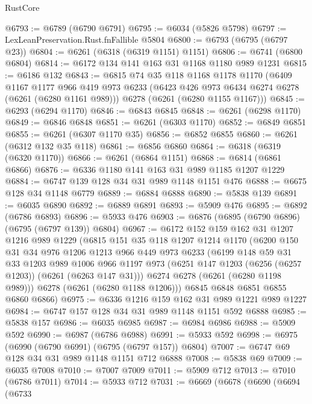 \begin{lexlean}{RustCore}
\begin{coremodule}
@6793 := @6789 (@6790 @6791)
@6795 := @6034 (@5826 @5798)
@6797 := LexLeanPreservation.Rust.fnFallible @5804
@6800 := @6793 (@6795 (@6797 @23))
@6804 := @6261 (@6318 (@6319 @1151) @1151)
@6806 := @6741 (@6800 @6804)
@6814 := @6172 @134 @141 @163 @31 @1168 @1180 @989 @1231
@6815 := @6186 @132
@6843 := @6815
    @74
    @35
    @118
    @1168
    @1178
    @1170
    (@6409
      @1167
      @1177
      @966
      @419
      @973
      @6233
      (@6423 @426 @973 @6434 @6274 @6278 (@6261 (@6280 @1161 @989)))
      @6278
      (@6261 (@6280 @1155 @1167)))
@6845 := @6293 (@6294 @1170)
@6846 := @6843 @6845
@6848 := @6261 (@6298 @1170)
@6849 := @6846 @6848
@6851 := @6261 (@6303 @1170)
@6852 := @6849 @6851
@6855 := @6261 (@6307 @1170 @35)
@6856 := @6852 @6855
@6860 := @6261 (@6312 @132 @35 @118)
@6861 := @6856 @6860
@6864 := @6318 (@6319 (@6320 @1170))
@6866 := @6261 (@6864 @1151)
@6868 := @6814 (@6861 @6866)
@6876 := @6336 @1180 @141 @163 @31 @989 @1185 @1207 @1229
@6884 := @6747 @139 @128 @34 @31 @989 @1148 @1151 @476
@6888 := @6675 @128 @34 @1148 @6779
@6889 := @6884 @6888
@6890 := @5838 @139
@6891 := @6035 @6890
@6892 := @6889 @6891
@6893 := @5909 @476
@6895 := @6892 (@6786 @6893)
@6896 := @5933 @476
@6903 := @6876 (@6895 (@6790 @6896) (@6795 (@6797 @139)) @6804)
@6967 := @6172
    @152
    @159
    @162
    @31
    @1207
    @1216
    @989
    @1229
    (@6815
      @151
      @35
      @118
      @1207
      @1214
      @1170
      (@6200
        @150
        @31
        @34
        @976
        @1206
        @1213
        @966
        @449
        @973
        @6233
        (@6199
          @148
          @59
          @31
          @33
          @1203
          @989
          @1006
          @966
          @1197
          @973
          (@6251 @147 @1203 (@6256 (@6257 @1203)) (@6261 (@6263 @147 @31)))
          @6274
          @6278
          (@6261 (@6280 @1198 @989)))
        @6278
        (@6261 (@6280 @1188 @1206)))
      @6845
      @6848
      @6851
      @6855
      @6860
      @6866)
@6975 := @6336 @1216 @159 @162 @31 @989 @1221 @989 @1227
@6984 := @6747 @157 @128 @34 @31 @989 @1148 @1151 @592 @6888
@6985 := @5838 @157
@6986 := @6035 @6985
@6987 := @6984 @6986
@6988 := @5909 @592
@6990 := @6987 (@6786 @6988)
@6991 := @5933 @592
@6998 := @6975 (@6990 (@6790 @6991) (@6795 (@6797 @157)) @6804)
@7007 := @6747 @69 @128 @34 @31 @989 @1148 @1151 @712 @6888
@7008 := @5838 @69
@7009 := @6035 @7008
@7010 := @7007 @7009
@7011 := @5909 @712
@7013 := @7010 (@6786 @7011)
@7014 := @5933 @712
@7031 := @6669
    (@6678
      (@6690
        (@6694
          (@6733

\end{coremodule}
\end{lexlean}
